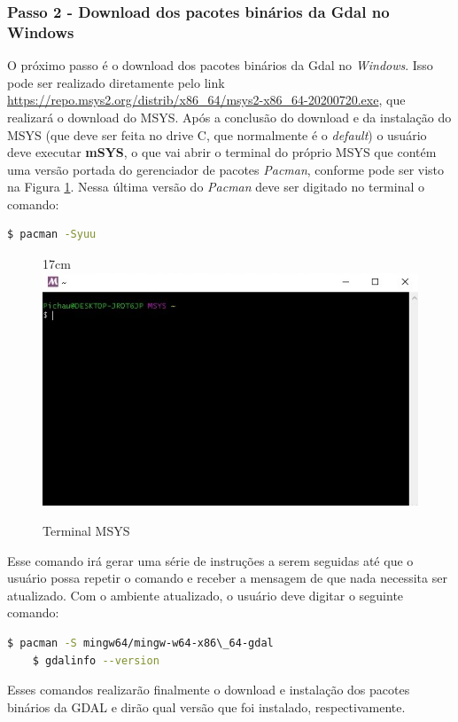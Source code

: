 \subsubsection{Passo 2 - Download dos pacotes binários da Gdal no Windows} 
O próximo passo é o download dos pacotes binários da Gdal no \textit{Windows}. Isso pode ser realizado diretamente pelo link  \url{https://repo.msys2.org/distrib/x86\_64/msys2-x86\_64-20200720.exe}, que realizará o download do MSYS. Após a conclusão do download e da instalação do MSYS (que deve ser feita no drive C, que normalmente é o \textit{default}) o usuário deve executar \textbf{mSYS}, o que vai abrir o terminal do próprio MSYS que contém uma versão portada do gerenciador de pacotes \textit{Pacman}, conforme pode ser visto na Figura \ref{fig:terminalgdal}. Nessa última versão do \textit{Pacman} deve ser digitado no terminal o comando:

\begin{lstlisting}[language=bash]
$ pacman -Syuu
\end{lstlisting}
 
\begin{figure}[!ht]{17cm}
 	\centering
 	\includegraphics[width=12cm]{Figuras/terminalgdal.jpg}
 	\caption{Terminal MSYS} \label{fig:terminalgdal}
\end{figure}
 

Esse comando irá gerar uma série de instruções a serem seguidas até que o usuário possa repetir o comando e receber a mensagem de que nada necessita ser atualizado. Com o ambiente atualizado, o usuário deve digitar o seguinte comando:
\begin{lstlisting}[language=bash]
 	$ pacman -S mingw64/mingw-w64-x86\_64-gdal
 	$ gdalinfo --version
\end{lstlisting}

Esses comandos realizarão finalmente o download e instalação dos pacotes binários da GDAL e dirão qual versão que foi instalado, respectivamente. 
 
